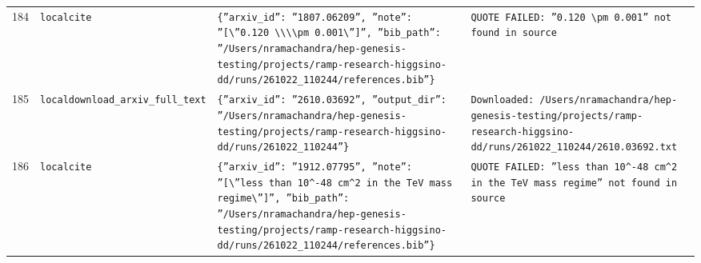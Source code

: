 \documentclass[11pt,a4paper]{article}
\begin{document}
\begin{longtable}{@{}p{}p{}p{}p{}@{}}
184 & \texttt{local}\newline\texttt{cite} & \texttt{\{''arxiv\_\allowbreak{}id'':\allowbreak{} ''1807.06209'',\allowbreak{} ''note'':\allowbreak{} ''[\textbackslash{}\allowbreak{}''0.120 \textbackslash{}\allowbreak{}\textbackslash{}\allowbreak{}\textbackslash{}\allowbreak{}\textbackslash{}\allowbreak{}pm 0.001\textbackslash{}\allowbreak{}'']\allowbreak{}'',\allowbreak{} ''bib\_\allowbreak{}path'':\allowbreak{} ''/\allowbreak{}Users/\allowbreak{}nramachandra/\allowbreak{}hep-genesis-testing/\allowbreak{}projects/\allowbreak{}ramp-research-higgsino-dd/\allowbreak{}runs/\allowbreak{}261022\_\allowbreak{}110244/\allowbreak{}references.bib''\}\allowbreak{}} & \texttt{QUOTE FAILED:\allowbreak{} ''0.120 \textbackslash{}\allowbreak{}pm 0.001'' not found in source} \\
185 & \texttt{local}\newline\texttt{download\_\allowbreak{}arxiv\_\allowbreak{}full\_\allowbreak{}text} & \texttt{\{''arxiv\_\allowbreak{}id'':\allowbreak{} ''2610.03692'',\allowbreak{} ''output\_\allowbreak{}dir'':\allowbreak{} ''/\allowbreak{}Users/\allowbreak{}nramachandra/\allowbreak{}hep-genesis-testing/\allowbreak{}projects/\allowbreak{}ramp-research-higgsino-dd/\allowbreak{}runs/\allowbreak{}261022\_\allowbreak{}110244''\}\allowbreak{}} & \texttt{Downloaded:\allowbreak{} /\allowbreak{}Users/\allowbreak{}nramachandra/\allowbreak{}hep-genesis-testing/\allowbreak{}projects/\allowbreak{}ramp-research-higgsino-dd/\allowbreak{}runs/\allowbreak{}261022\_\allowbreak{}110244/\allowbreak{}2610.03692.txt} \\
186 & \texttt{local}\newline\texttt{cite} & \texttt{\{''arxiv\_\allowbreak{}id'':\allowbreak{} ''1912.07795'',\allowbreak{} ''note'':\allowbreak{} ''[\textbackslash{}\allowbreak{}''less than 10\textasciicircum{}\allowbreak{}-48 cm\textasciicircum{}\allowbreak{}2 in the TeV mass regime\textbackslash{}\allowbreak{}'']\allowbreak{}'',\allowbreak{} ''bib\_\allowbreak{}path'':\allowbreak{} ''/\allowbreak{}Users/\allowbreak{}nramachandra/\allowbreak{}hep-genesis-testing/\allowbreak{}projects/\allowbreak{}ramp-research-higgsino-dd/\allowbreak{}runs/\allowbreak{}261022\_\allowbreak{}110244/\allowbreak{}references.bib''\}\allowbreak{}} & \texttt{QUOTE FAILED:\allowbreak{} ''less than 10\textasciicircum{}\allowbreak{}-48 cm\textasciicircum{}\allowbreak{}2 in the TeV mass regime'' not found in source} \\

\end{longtable}
\end{document}
